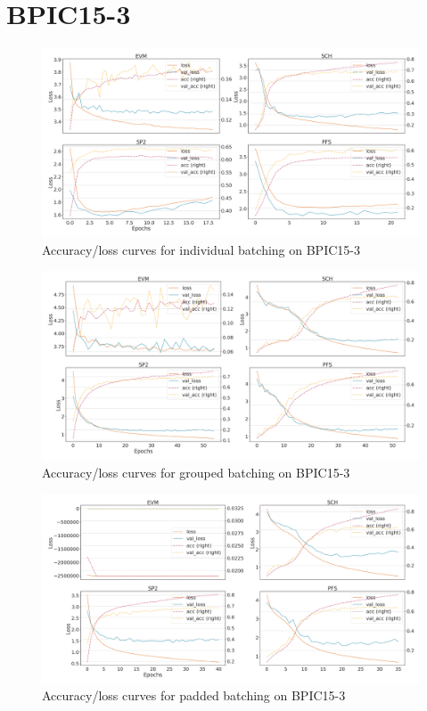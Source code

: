 \section*{BPIC15-3}
\begin{figure}[!htb]
    \centering
    \includegraphics[width=\textwidth]{gfx/bpic2015_3/individual_loss_acc_curve.png}
    \caption{Accuracy/loss curves for individual batching on BPIC15-3}
\end{figure}
\begin{figure}[!htb]
    \centering
    \includegraphics[width=\textwidth]{gfx/bpic2015_3/grouped_loss_acc_curve.png}
    \caption{Accuracy/loss curves for grouped batching on BPIC15-3}
\end{figure}
\begin{figure}[!htb]
    \centering
    \includegraphics[width=\textwidth]{gfx/bpic2015_3/padded_loss_acc_curve.png}
    \caption{Accuracy/loss curves for padded batching on BPIC15-3}
\end{figure}
